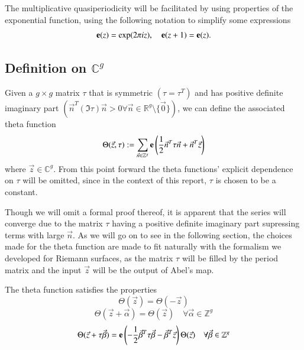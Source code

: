 The multiplicative quasiperiodicity will be facilitated by using properties of the exponential function, using the following notation to simplify some expressions
\begin{equation}
    \mathbf{e}(z) = \exp(2\pi i z), \quad \mathbf{e}(z+1)=\mathbf{e}(z).
\end{equation}

\subsection{Definition on $\mathbb C^g$}

\begin{definition}\label{defB12:thetaGeneralDefn}
    Given a $g \times g$ matrix $\tau$ that is symmetric $(\tau = \tau^T)$ and has positive definite imaginary part $(\vec n^T (\Im \tau) \vec n > 0 \forall \vec n \in \mathbb R^g \setminus \{\vec 0\})$, we can define the associated theta function
    \begin{equation}
        \Theta(\vec z,\tau) := \sum_{\vec n \in \mathbb Z^g} \mathbf{e}\left(\frac{1}{2} \vec n^T \tau \vec n + \vec n^T \vec z\right)
    \end{equation}
    where $\vec z \in \mathbb C^g$. From this point forward the theta functions' explicit dependence on $\tau$ will be omitted, since in the context of this report, $\tau$ is chosen to be a constant.
\end{definition}

Though we will omit a formal proof thereof, it is apparent that the series will converge due to the matrix $\tau$ having a positive definite imaginary part supressing terms with large $\vec n$. As we will go on to see in the following section, the choices made for the theta function are made to fit naturally with the formalism we developed for Riemann surfaces, as the matrix $\tau$ will be filled by the period matrix and the input $\vec z$ will be the output of Abel's map.

\begin{lemma}
    \label{lemmaB12:thetaGeneralProperties}
    The theta function satisfies the properties
    \begin{equation} \label{eqnB12:thetaGeneralEven}
        \Theta(\vec z) = \Theta(-\vec z)
    \end{equation}
    \begin{equation} \label{eqnB12:thetaGeneralShift}
        \Theta(\vec z+\vec \alpha) = \Theta(\vec z) \quad \forall \vec \alpha \in \mathbb Z^g
    \end{equation}
    \begin{equation} \label{eqnB12:thetaGeneralTauShift}
        \Theta(\vec z + \tau \vec \beta) = \mathbf{e}\left(-\frac{1}{2}\vec \beta^T \tau \vec \beta - \vec \beta^T \vec z\right) \Theta(\vec z) \quad \forall \vec \beta \in \mathbb Z^g
    \end{equation}
\end{lemma}

